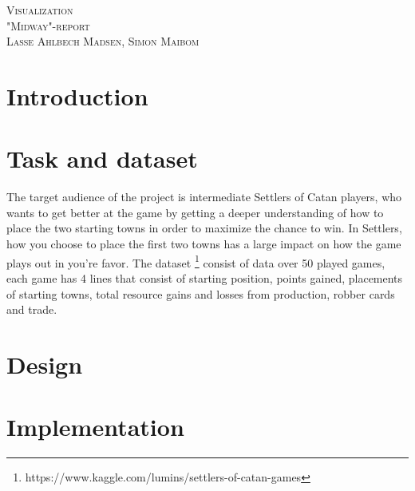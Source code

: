 \documentclass{article}
\begin{document}
\begin{center}
\textsc{\Large Visualization}\\[0.5cm]
\textsc{\large "Midway"-report}\\[0.5cm]
\textsc{\large Lasse Ahlbech Madsen, Simon Maibom}\\[0.5cm]
\vspace{1 cm}
\end{center}

\section{Introduction}


\section{Task and dataset}
The target audience of the project is intermediate Settlers of Catan players, who wants to get better at the game by getting a deeper understanding of how to place the two starting towns in order to maximize the chance to win. In Settlers, how you choose to place the first two towns has a large impact on how the game plays out in you're favor.
The dataset \footnote{https://www.kaggle.com/lumins/settlers-of-catan-games} consist of data over 50 played games, each game has 4 lines that consist of starting position, points gained, placements of starting towns, total resource gains and losses from production, robber cards and trade.

\section{Design}


\section{Implementation}
\end{document}
